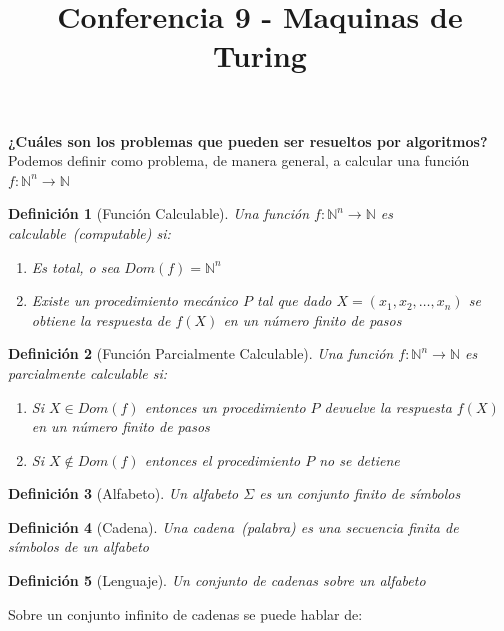 \documentclass[a4paper,1pt]{report}
\title{Conferencia 9 - Maquinas de Turing}
\author{}
\newtheorem*{dfn}{Definición}
\begin{document}
\maketitle

\textbf{¿Cuáles son los problemas que pueden ser resueltos por algoritmos?}\\

Podemos definir como problema, de manera general, a calcular una función $f:\mathbb{N}^n\rightarrow \mathbb{N}$ 

\begin{dfn}[Función Calculable]
 Una función $f:\mathbb{N}^n\rightarrow \mathbb{N}$  es calculable~(computable) si:
 \begin{enumerate}
  \item Es total, o sea $Dom(f)=\mathbb{N}^n$
  \item Existe un procedimiento mecánico $P$ tal que dado $X=(x_1,x_2,\dots,x_n)$ se obtiene la respuesta
  de $f(X)$ en un número finito de pasos
 \end{enumerate}

\end{dfn}

\begin{dfn}[Función Parcialmente Calculable]
 Una función $f:\mathbb{N}^n\rightarrow \mathbb{N}$  es parcialmente calculable si:
 \begin{enumerate}
  \item Si $X\in Dom(f)$ entonces un procedimiento $P$ devuelve la respuesta $f(X)$ en un número finito 
  de pasos
  \item Si $X\not\in Dom(f)$ entonces el procedimiento $P$ no se detiene
 \end{enumerate}

\end{dfn}

\begin{dfn}[Alfabeto]
 Un alfabeto $\Sigma$ es un conjunto finito de símbolos
\end{dfn}

\begin{dfn}[Cadena]
 Una cadena~(palabra) es una secuencia finita de símbolos de un alfabeto
\end{dfn}

\begin{dfn}[Lenguaje]
 Un conjunto de cadenas sobre un alfabeto
\end{dfn}

Sobre un conjunto infinito de cadenas se puede hablar de:
\end{document}
